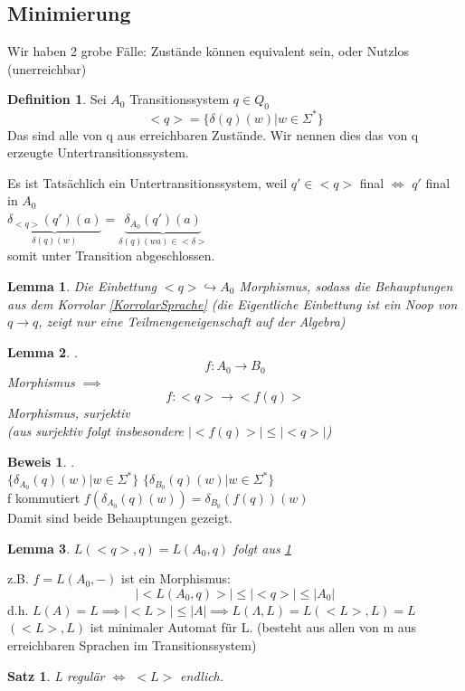 \documentclass{article}
\newtheorem{satz}{Satz}
\newtheorem{lemma}{Lemma}[section]
\theoremstyle{definition}
\newtheorem{beweis}{Beweis}[section]
\newtheorem{definition}{Definition}[section]
\begin{document}
	 \subsection{Minimierung}
	 Wir haben 2 grobe Fälle: Zustände können equivalent sein, oder Nutzlos (unerreichbar)
	 \begin{definition} Sei $A_0$ Transitionssystem $q\in Q_0$
	 \[<q> =\{\delta(q)(w) | w\in\Sigma^*\}\]
	 Das sind alle von q aus erreichbaren Zustände. Wir nennen dies das von q erzeugte Untertransitionssystem.\\
	 \end{definition}
	 Es ist Tatsächlich ein Untertransitionssystem, weil $q'\in <q>$ final $\iff$ $q'$ final in $A_0$\\
	 $\underbrace{\delta_{<q>}(q')(a)}_{\delta(q)(w)}=\underbrace{\delta_{A_0}(q')(a)}_{\delta(q)(wa)\in <\delta>}$\\
	 somit unter Transition abgeschlossen.
	 \begin{lemma}\label{einbettung} Die Einbettung $<q>\hookrightarrow A_0$ Morphismus, sodass die Behauptungen aus dem Korrolar \ref{KorrolarSprache}
	 (die Eigentliche Einbettung ist ein Noop von $q\to q$, zeigt nur eine Teilmengeneigenschaft auf der Algebra)
	 \end{lemma}
	 \begin{lemma} .\\
	 \[f:A_0\to B_0\]
	 Morphismus $\implies$
	 \[f:<q>\to <f(q)>\]
	 Morphismus, surjektiv\\
	 (aus surjektiv folgt insbesondere $|<f(q)>|\leq |<q>|$)
	 \end{lemma}
	 \begin{beweis}.\\
	 $\{\delta_{A_0}(q)(w)|w\in\Sigma^*\}$ $\{\delta_{B_0}(q)(w)|w\in\Sigma^*\}$\\
	 f kommutiert $f(\delta_{A_0}(q)(w))=\delta_{B_0}(f(q))(w)$\\
	 Damit sind beide Behauptungen gezeigt.
	 \end{beweis}
	 \begin{lemma} $L(<q>,q) = L(A_0,q)$ folgt aus \ref{einbettung}
	 \end{lemma}
	 z.B. $f = L(A_0,-)$ ist ein Morphismus:
	 \[|<L(A_0,q)>| \leq |<q>| \leq |A_0|\]
	 d.h. $L(A)=L \implies |<L>|\leq |A|\implies L(\Lambda, L) = L(<L>,L) =L $ $(<L>,L)$ ist minimaler Automat für L. (besteht aus allen von m aus erreichbaren Sprachen im Transitionssystem)
	 \begin{satz} L regulär $\iff$ $<L>$ endlich.
	 \end{satz}
\end{document}
